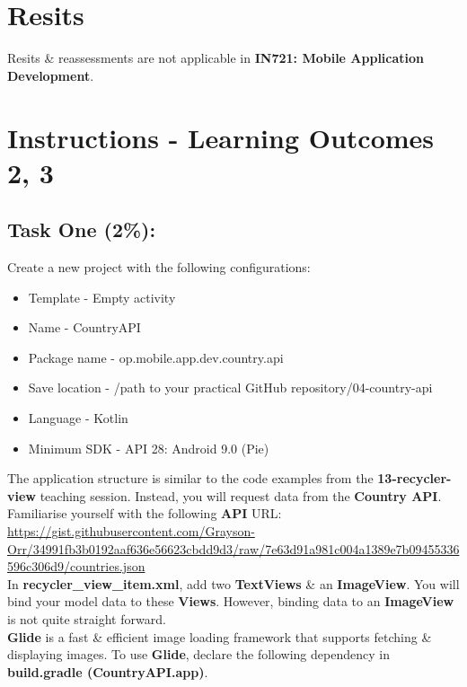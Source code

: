 \documentclass{article}
\begin{document}
\section*{Resits}
Resits \& reassessments are not applicable in \textbf{IN721: Mobile Application Development}.

\section*{Instructions - Learning Outcomes 2, 3}
\subsection*{Task One (2\%):}
Create a new project with the following configurations:
\begin{itemize}
	\item Template - Empty activity
	\item Name - CountryAPI
	\item Package name - op.mobile.app.dev.country.api
	\item Save location - /path to your practical GitHub repository/04-country-api
	\item Language - Kotlin
	\item Minimum SDK - API 28: Android 9.0 (Pie) 
\end{itemize} 

The application structure is similar to the code examples from the \textbf{13-recycler-view} teaching session. Instead, you will request data from the \textbf{Country API}. \\

Familiarise yourself with the following \textbf{API} URL: \\

\href{https://gist.githubusercontent.com/Grayson-Orr/34991fb3b0192aaf636e56623cbdd9d3/raw/7e63d91a981c004a1389e7b09455336596c306d9/countries.json}{https://gist.githubusercontent.com/Grayson-Orr/34991fb3b0192aaf636e56623cbdd9d3/raw/7e63d91a981c004a1389e7b09455336596c306d9/countries.json} \\

In \textbf{recycler\_view\_item.xml}, add two \textbf{TextViews} \& an \textbf{ImageView}. You will bind your model data to these \textbf{Views}. However, binding data to an \textbf{ImageView} is not quite straight forward.  \\

\textbf{Glide} is a fast \& efficient image loading framework that supports fetching \& displaying images. To use \textbf{Glide}, declare the following dependency in \textbf{build.gradle (CountryAPI.app)}.
\end{document}
